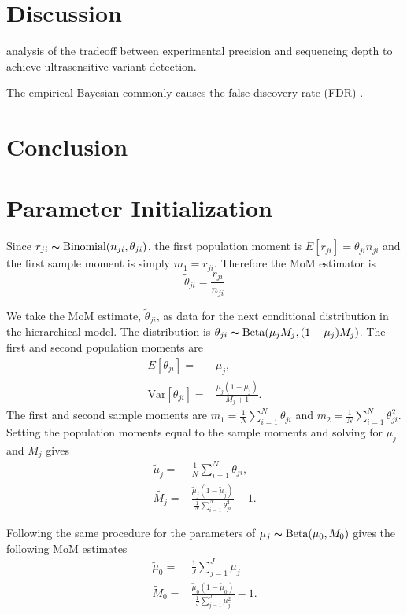 \documentclass[11pt,reqno]{amsart}
\begin{document}
\section{Discussion}
analysis of the tradeoff between experimental precision and sequencing depth to achieve ultrasensitive variant detection.

The empirical Bayesian commonly causes the false discovery rate (FDR) \citep{efron2010large}.


\section{Conclusion}


\appendix
\section{Parameter Initialization}\label{sec:appendix_mom}
Since $r_{ji} \thicksim \text{Binomial}(n_{ji}, \theta_{ji})$, the first population moment is  $E[r_{ji}] = \theta_{ji} n_{ji}$ and the first sample moment is simply $m_1 = r_{ji}$.
Therefore the MoM estimator is
\begin{equation}
	\tilde{\theta}_{ji} = \frac{r_{ji}} {n_{ji}}
\end{equation}

We take the MoM estimate, $\tilde{\theta}_{ji}$, as data for the next conditional distribution in the hierarchical model.
The distribution is $\theta_{ji} \thicksim \text{Beta}(\mu_jM_j, (1-\mu_j)M_j)$. The first and second population moments are
\begin{eqnarray}
	E[\theta_{ji}] =& \mu_j,\\
	\text{Var}[\theta_{ji}] =& \frac{\mu_j(1-\mu_j)} { M_j + 1 }.
\end{eqnarray}
The first and second sample moments are $m_1 = \frac{1}{N}\sum_{i=1}^N \theta_{ji}$ and $m_2 = \frac{1}{N}\sum_{i=1}^N \theta_{ji}^2$.
Setting the population moments equal to the sample moments and solving for $\mu_j$ and $M_j$ gives
\begin{eqnarray}
	\tilde{\mu}_j =& \frac{1}{N} \sum_{i=1}^N \theta_{ji}, \\
	\tilde{M_j} =& \frac{ \tilde{\mu}_j (1 - \tilde{\mu}_j ) } { \frac{1}{N} \sum_{i=1}^N \theta_{ji}^2 } -1.
\end{eqnarray}

Following the same procedure for the parameters of $\mu_j \thicksim \text{Beta}(\mu_0, M_0)$ gives the following MoM estimates
\begin{eqnarray}
	\tilde{\mu}_0 =& \frac{1}{J} \sum_{j=1}^J \mu_j \\
	\tilde{M}_0 =& \frac{ \tilde{\mu}_0 (1 - \tilde{\mu}_0 ) } {\frac{1}{J} \sum_{j=1}^J \mu_j^2 } -1.
\end{eqnarray}
\end{document}

